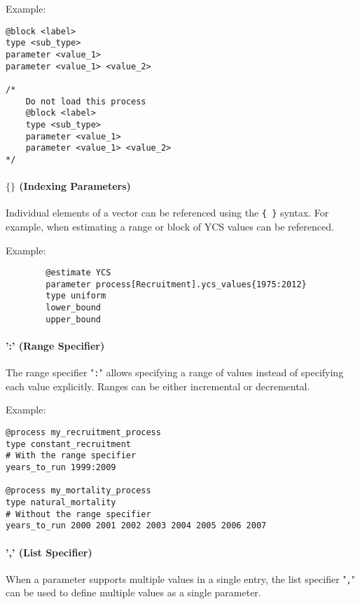 Example:

{\small{\begin{verbatim}
@block <label>
type <sub_type>
parameter <value_1>
parameter <value_1> <value_2>

/*
	Do not load this process
	@block <label>
	type <sub_type>
	parameter <value_1>
	parameter <value_1> <value_2>
*/
\end{verbatim}}}

\paragraph*{$\{ \}$ (Indexing Parameters)}

Individual elements of a vector can be referenced using the \texttt{\{ \}} syntax. For example, when estimating  a range or block of YCS values can be referenced.

Example:

{\small{\begin{verbatim}
		@estimate YCS
		parameter process[Recruitment].ycs_values{1975:2012}
		type uniform
		lower_bound
		upper_bound
		\end{verbatim}}}

\paragraph*{':' (Range Specifier)}

The range specifier "\texttt{:}" allows specifying a range of values instead of specifying each value explicitly. Ranges can be either incremental or decremental.

Example:

{\small{\begin{verbatim}
@process my_recruitment_process
type constant_recruitment
# With the range specifier
years_to_run 1999:2009

@process my_mortality_process
type natural_mortality
# Without the range specifier
years_to_run 2000 2001 2002 2003 2004 2005 2006 2007
\end{verbatim}}}

\paragraph*{',' (List Specifier)}

When a parameter supports multiple values in a single entry, the list specifier "\texttt{,}" can be used to define multiple values as a single parameter.

